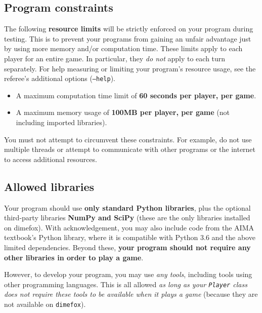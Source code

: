 \documentclass[]{article}
\begin{document}

\subsection{Program constraints}

The following \textbf{resource limits} will be strictly enforced on
your program during testing.
%
This is to prevent your programs from gaining an unfair advantage
just by using more memory and/or computation time.
% 
These limits apply to each player for an entire game.
In particular, they \emph{do not} apply to each turn separately.
%
For help measuring or limiting your program's resource usage, see the
referee's additional options (\texttt{--help}).
%
\begin{itemize}
\item
  A maximum computation time limit of \textbf{60 seconds per player, per
  game}.
\item
  A maximum memory usage of \textbf{100MB per player, per game} (not
  including imported libraries).
\end{itemize}
%
You must not attempt to circumvent these constraints.
%
For example, do not use multiple threads or attempt to communicate
with other programs or the internet to access additional resources.

\subsection{Allowed libraries}

Your program should use \textbf{only standard Python libraries}, plus the
optional third-party libraries \textbf{NumPy and SciPy} (these are the
only libraries installed on dimefox).
With acknowledgement, you may also include code from the AIMA textbook's
Python library, where it is compatible with Python 3.6 and the above
limited dependencies.
%
Beyond these, \textbf{your program should not require any other libraries
in order to play a game}.

However, to develop your program, you may use \emph{any tools}, including
tools using other programming languages.
%
This is all allowed \emph{as long as your \texttt{Player} class does not
require these tools to be available when it plays a game}
(because they are not available on \texttt{dimefox}).
\end{document}
